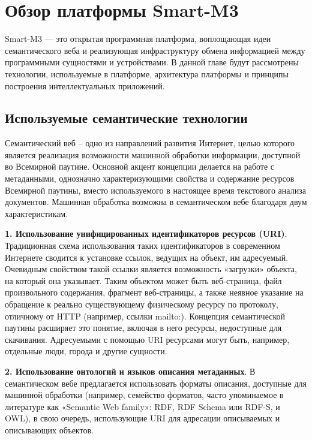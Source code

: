 \chapter{Обзор платформы Smart-M3}

Smart-M3 --- это открытая программная платформа, воплощающая идеи семантического веба и реализующая инфраструктуру обмена информацией между программными сущностями и устройствами. В данной главе будут рассмотрены технологии, используемые в платформе, архитектура платформы и принципы построения интеллектуальных приложений.

\section{Используемые семантические технологии}


Семантический веб \cite{semantic} -- одно из направлений развития Интернет, целью которого является реализация возможности машинной обработки информации, доступной во Всемирной паутине. Основной акцент концепции делается на работе с метаданными, однозначно характеризующими свойства и содержание ресурсов Всемирной паутины, вместо используемого в настоящее время текстового анализа документов.
Машинная обработка возможна в семантическом вебе благодаря двум характеристикам.

{\bf 1. Использование унифицированных идентификаторов ресурсов (URI)}.
Традиционная схема использования таких идентификаторов в современном Интернете сводится к установке ссылок, ведущих на объект, им адресуемый. Очевидным свойством такой ссылки является возможность «загрузки» объекта, на который она указывает. Таким объектом может быть веб-страница, файл произвольного содержания, фрагмент веб-страницы, а также неявное указание на обращение к реально существующему физическому ресурсу по протоколу, отличному от HTTP (например, ссылки mailto:). Концепция семантической паутины расширяет это понятие, включая в него ресурсы, недоступные для скачивания. Адресуемыми с помощью URI ресурсами могут быть, например, отдельные люди, города и другие сущности.

{\bf 2. Использование онтологий и языков описания метаданных}.
В семантическом вебе предлагается использовать форматы описания, доступные для машинной обработки (например, семейство форматов, часто упоминаемое в литературе как «Semantic Web family»: RDF, RDF Schema или RDF-S, и OWL), в свою очередь, использующие URI для адресации описываемых и описывающих объектов.


